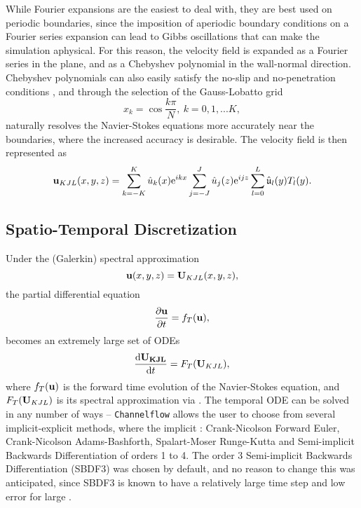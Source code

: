 While Fourier expansions are the easiest to deal with, they are best used on periodic boundaries, since the imposition of aperiodic boundary conditions on a Fourier series expansion can lead to Gibbs oscillations that can make the simulation aphysical. For this reason, the velocity field is expanded as a Fourier series in the plane, and as a Chebyshev polynomial in the wall-normal direction. Chebyshev polynomials can also easily satisfy the no-slip and no-penetration conditions , and through the selection of the Gauss-Lobatto grid
\begin{equation}
x_{k} = \cos{\dfrac{k\pi}{N}},~k = 0,1,...K,
\end{equation}
naturally resolves the Navier-Stokes equations more accurately near the boundaries, where the increased accuracy is desirable. The velocity field is then represented as 
\begin{equation}
\Vector{u}_{KJL}(x,y,z) = \sum{k=-K}{K}{\hat{u}_k(x)\exp{ikx}}\sum{j=-J}{J}{\hat{u}_j(z)\exp{ijz}}\sum{l=0}{L}{\hat{\mathfrak{u}}_l(y)T_l(y)}.
\end{equation}

\subsection{Spatio-Temporal Discretization} 

Under the (Galerkin) spectral approximation 
\begin{equation}
\mathbf{u}(x,y,z) = \mathbf{U}_{KJL}(x,y,z),
\end{equation}
the partial differential equation
\begin{equation}
\pder{1}{\Vector{u}}{t} = f_T(\Vector{u}),
\end{equation}
becomes an extremely large set of ODEs
\begin{equation}
\der{1}{\Vector{U_{KJL}}}{t} = F_T(\Vector{U}_{KJL}), 
\end{equation}
where $f_T(\mathbf{u})$ is the forward time evolution of the Navier-Stokes equation, and $F_T(\mathbf{U}_{KJL})$ is its spectral approximation via . The temporal ODE can be solved in any number of ways -- {\tt Channelflow} allows the user to choose from several implicit-explicit methods, where the implicit : Crank-Nicolson Forward Euler, Crank-Nicolson Adams-Bashforth, Spalart-Moser Runge-Kutta and Semi-implicit Backwards Differentiation of orders 1 to 4. The order 3 Semi-implicit Backwards Differentiation (SBDF3) was chosen by default, and no reason to change this was anticipated, since SBDF3 is known to have a relatively large time step and low error for large \ReN{}.

